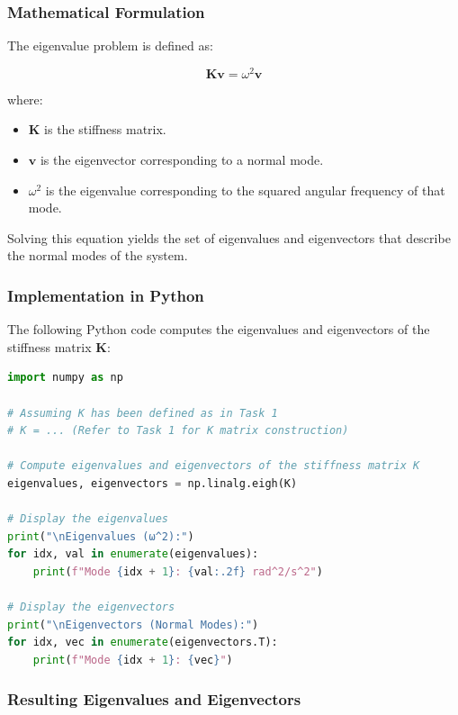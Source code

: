 \documentclass[12pt]{report} %
\begin{document}
\subsubsection{Mathematical Formulation}
\label{subsubsec:part2_task2_eigen_math}

The eigenvalue problem is defined as:

\[
\mathbf{K} \mathbf{v} = \omega^2 \mathbf{v}
\]

where:
\begin{itemize}
    \item \( \mathbf{K} \) is the stiffness matrix.
    \item \( \mathbf{v} \) is the eigenvector corresponding to a normal mode.
    \item \( \omega^2 \) is the eigenvalue corresponding to the squared angular frequency of that mode.
\end{itemize}

Solving this equation yields the set of eigenvalues and eigenvectors that describe the normal modes of the system.

\subsubsection{Implementation in Python}
\label{subsubsec:part2_task2_eigen_code}

The following Python code computes the eigenvalues and eigenvectors of the stiffness matrix \( \mathbf{K} \):

\begin{lstlisting}[language=Python, caption={Computing Eigenvalues and Eigenvectors of \( \mathbf{K} \)}, label={lst:eigen_problem_task2}]
import numpy as np

# Assuming K has been defined as in Task 1
# K = ... (Refer to Task 1 for K matrix construction)

# Compute eigenvalues and eigenvectors of the stiffness matrix K
eigenvalues, eigenvectors = np.linalg.eigh(K)

# Display the eigenvalues
print("\nEigenvalues (ω^2):")
for idx, val in enumerate(eigenvalues):
    print(f"Mode {idx + 1}: {val:.2f} rad^2/s^2")

# Display the eigenvectors
print("\nEigenvectors (Normal Modes):")
for idx, vec in enumerate(eigenvectors.T):
    print(f"Mode {idx + 1}: {vec}")
\end{lstlisting}

\subsubsection{Resulting Eigenvalues and Eigenvectors}
\label{subsubsec:part2_task2_results}
\end{document}
